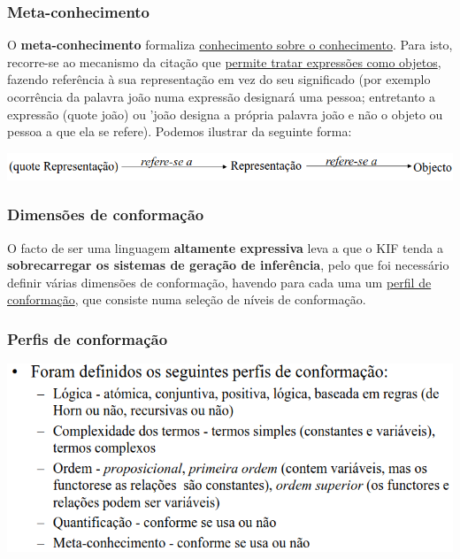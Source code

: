 \documentclass{article}
\begin{document}
\subsubsection{Meta-conhecimento}

O \textbf{meta-conhecimento} formaliza \uline{conhecimento sobre o conhecimento}. Para isto, recorre-se ao
mecanismo da citação que \uline{permite tratar expressões como objetos}, fazendo referência à sua
representação em vez do seu significado (por exemplo  ocorrência da palavra joão numa expressão designará
uma pessoa; entretanto a expressão (quote joão) ou 'joão designa a
própria palavra joão e não o objeto ou pessoa a que ela se refere).
Podemos ilustrar da seguinte forma:

\begin{center}
  \includegraphics[scale=0.35]{41}
\end{center}

\subsubsection{Dimensões de conformação}

O facto de ser uma linguagem \textbf{altamente expressiva} leva a que o KIF tenda a \textbf{sobrecarregar os
sistemas de geração de inferência}, pelo que foi necessário definir várias dimensões de
conformação, havendo para cada uma um \uline{perfil de conformação}, que consiste numa seleção
de níveis de conformação.

\subsubsection{Perfis de conformação}

\begin{center}
  \includegraphics[scale=0.4]{42}
\end{center}
\end{document}
